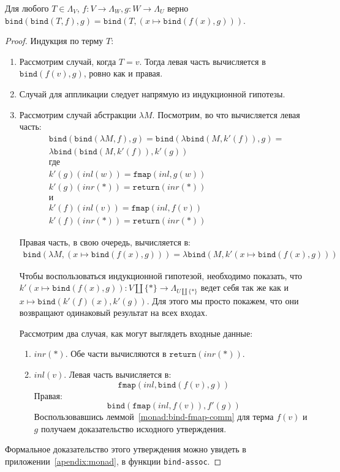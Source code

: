 \begin{prop}
  \label{monad:bind-assoc}
  Для любого $T \in \Lambda_{V}$, $f : V \to \Lambda_{W}, g : W \to \Lambda_{U}$ верно $\texttt{bind}(\texttt{bind}(T, f), g) = \texttt{bind}(T, (x \mapsto \texttt{bind}(f(x), g)) )$.
\end{prop}

\begin{proof}
  Индукция по терму $T$:
  \begin{enumerate}
    \item Рассмотрим случай, когда $T = v$. Тогда левая часть вычисляется в $\texttt{bind}(f(v), g)$, ровно как и правая.
    \item Случай для аппликации следует напрямую из индукционной гипотезы.
    \item Рассмотрим случай абстракции $\lambda M$. Посмотрим, во что вычисляется левая часть:
    \begin{gather*}
      \texttt{bind}(\texttt{bind}(\lambda M, f), g) = \texttt{bind}(\lambda \texttt{bind}(M, k'(f)), g) = \\
      \lambda \texttt{bind}(\texttt{bind}(M, k'(f)), k'(g)) \\
      \text{где} \\
      k'(g)(inl(w)) = \texttt{fmap}(inl, g(w)) \\
      k'(g)(inr(*)) = \texttt{return}(inr(*)) \\
      \text{и} \\
      k'(f)(inl(v)) = \texttt{fmap}(inl, f(v)) \\
      k'(f)(inr(*)) = \texttt{return}(inr(*))
    \end{gather*}

    Правая часть, в свою очередь, вычисляется в:
    \begin{gather*}
      \texttt{bind}(\lambda M, (x \mapsto \texttt{bind}(f(x), g))) = \lambda \texttt{bind}(M, k'(x \mapsto \texttt{bind}(f(x), g)))
    \end{gather*}

    Чтобы воспользоваться индукционной гипотезой, необходимо показать, что $k'(x \mapsto \texttt{bind}(f(x), g)) : V \coprod \{*\} \to \Lambda_{U \coprod \{*\}}$ ведет себя так же как и $x \mapsto \texttt{bind}(k'(f)(x), k'(g))$. Для этого мы просто покажем, что они возвращают одинаковый результат на всех входах.

    Рассмотрим два случая, как могут выглядеть входные данные:
    \begin{enumerate}
      \item $inr(*)$. Обе части вычисляются в $\texttt{return}(inr(*))$.
      \item $inl(v)$. Левая часть вычисляется в: $$ \texttt{fmap}(inl, \texttt{bind}(f(v), g)) $$
      Правая: $$\texttt{bind}(\texttt{fmap}(inl, f(v)), f'(g))$$
      Воспользовавшись леммой~\ref{monad:bind-fmap-comm} для терма $f(v)$ и $g$ получаем доказательство исходного утверждения. \qedhere
    \end{enumerate}
  \end{enumerate}

  Формальное доказательство этого утверждения можно увидеть в приложении~\ref{apendix:monad}, в функции \texttt{bind-assoc}.
\end{proof}
